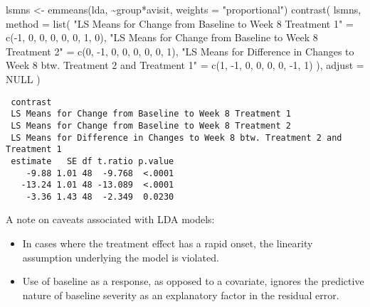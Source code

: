 \documentclass[
  letterpaper,
  DIV=11,
  numbers=noendperiod]{scrreprt}
\newenvironment{Shaded}{\begin{snugshade}}{\end{snugshade}}
\newcommand{\AttributeTok}[1]{\textcolor[rgb]{0.40,0.45,0.13}{#1}}
\newcommand{\ConstantTok}[1]{\textcolor[rgb]{0.56,0.35,0.01}{#1}}
\newcommand{\DecValTok}[1]{\textcolor[rgb]{0.68,0.00,0.00}{#1}}
\newcommand{\FunctionTok}[1]{\textcolor[rgb]{0.28,0.35,0.67}{#1}}
\newcommand{\NormalTok}[1]{\textcolor[rgb]{0.00,0.23,0.31}{#1}}
\newcommand{\OtherTok}[1]{\textcolor[rgb]{0.00,0.23,0.31}{#1}}
\newcommand{\SpecialCharTok}[1]{\textcolor[rgb]{0.37,0.37,0.37}{#1}}
\newcommand{\StringTok}[1]{\textcolor[rgb]{0.13,0.47,0.30}{#1}}
\begin{document}
\begin{Shaded}
\begin{Highlighting}[]
\NormalTok{lsmns }\OtherTok{\textless{}{-}} \FunctionTok{emmeans}\NormalTok{(lda, }\SpecialCharTok{\textasciitilde{}}\NormalTok{group}\SpecialCharTok{*}\NormalTok{avisit, }\AttributeTok{weights =} \StringTok{"proportional"}\NormalTok{)}
\FunctionTok{contrast}\NormalTok{(}
\NormalTok{  lsmns,}
  \AttributeTok{method =} \FunctionTok{list}\NormalTok{(}
    \StringTok{"LS Means for Change from Baseline to Week 8 Treatment 1"} \OtherTok{=} \FunctionTok{c}\NormalTok{(}\SpecialCharTok{{-}}\DecValTok{1}\NormalTok{, }\DecValTok{0}\NormalTok{, }\DecValTok{0}\NormalTok{, }\DecValTok{0}\NormalTok{, }\DecValTok{0}\NormalTok{, }\DecValTok{0}\NormalTok{, }\DecValTok{1}\NormalTok{, }\DecValTok{0}\NormalTok{),}
    \StringTok{"LS Means for Change from Baseline to Week 8 Treatment 2"} \OtherTok{=} \FunctionTok{c}\NormalTok{(}\DecValTok{0}\NormalTok{, }\SpecialCharTok{{-}}\DecValTok{1}\NormalTok{, }\DecValTok{0}\NormalTok{, }\DecValTok{0}\NormalTok{, }\DecValTok{0}\NormalTok{, }\DecValTok{0}\NormalTok{, }\DecValTok{0}\NormalTok{, }\DecValTok{1}\NormalTok{),}
    \StringTok{"LS Means for Difference in Changes to Week 8 btw. Treatment 2 and Treatment 1"} \OtherTok{=} \FunctionTok{c}\NormalTok{(}\DecValTok{1}\NormalTok{, }\SpecialCharTok{{-}}\DecValTok{1}\NormalTok{, }\DecValTok{0}\NormalTok{, }\DecValTok{0}\NormalTok{, }\DecValTok{0}\NormalTok{, }\DecValTok{0}\NormalTok{, }\SpecialCharTok{{-}}\DecValTok{1}\NormalTok{, }\DecValTok{1}\NormalTok{)}
\NormalTok{  ), }
  \AttributeTok{adjust =} \ConstantTok{NULL}
\NormalTok{)}
\end{Highlighting}
\end{Shaded}

\begin{verbatim}
 contrast                                                                     
 LS Means for Change from Baseline to Week 8 Treatment 1                      
 LS Means for Change from Baseline to Week 8 Treatment 2                      
 LS Means for Difference in Changes to Week 8 btw. Treatment 2 and Treatment 1
 estimate   SE df t.ratio p.value
    -9.88 1.01 48  -9.768  <.0001
   -13.24 1.01 48 -13.089  <.0001
    -3.36 1.43 48  -2.349  0.0230
\end{verbatim}

A note on caveats associated with LDA models:

\begin{itemize}
\item
  In cases where the treatment effect has a rapid onset, the linearity
  assumption underlying the model is violated.
\item
  Use of baseline as a response, as opposed to a covariate, ignores the
  predictive nature of baseline severity as an explanatory factor in the
  residual error.
\end{itemize}
\end{document}

